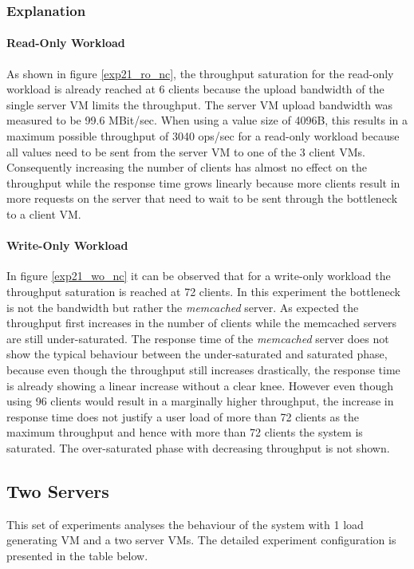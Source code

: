 \documentclass[report.tex]{subfiles}
\begin{document}
\subsubsection{Explanation}

\paragraph{Read-Only Workload}
As shown in figure \ref{exp21_ro_nc}, the throughput saturation for the read-only workload is already reached at 6 clients because the upload bandwidth of the single server VM limits the throughput. The server VM upload bandwidth was measured to be 99.6 MBit/sec. When using a value size of 4096B, this results in a maximum possible throughput of 3040 ops/sec for a read-only workload because all values need to be sent from the server VM to one of the 3 client VMs. 
Consequently increasing the number of clients has almost no effect on the throughput while the response time grows linearly because more clients result in more requests on the server that need to wait to be sent through the bottleneck to a client VM.

\paragraph{Write-Only Workload}
In figure \ref{exp21_wo_nc} it can be observed that for a write-only workload the throughput saturation is reached at 72 clients. In this experiment the bottleneck is not the bandwidth but rather the \emph{memcached} server. 
As expected the throughput first increases in the number of clients while the memcached servers are still under-saturated. The response time of the \emph{memcached} server does not show the typical behaviour between the under-saturated and saturated phase, because even though the throughput still increases drastically, the response time is already showing a linear increase without a clear knee.
However even though using 96 clients would result in a marginally higher throughput, the increase in response time does not justify a user load of more than 72 clients as the maximum throughput and hence with more than 72 clients the system is saturated. The over-saturated phase with decreasing throughput is not shown.


\subsection{Two Servers}\label{exp22}


This set of experiments analyses the behaviour of the system with 1 load generating VM and a two server VMs. The detailed experiment configuration is presented in the table below.
\end{document}
